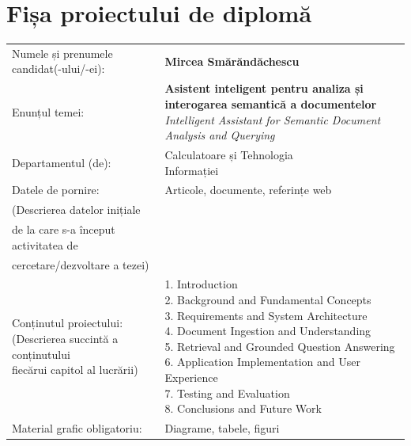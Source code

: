 \chapter*{Fișa proiectului de diplomă}
\begin{tabular}{@{}p{0.46\textwidth}p{0.48\textwidth}@{}}
	Numele și prenumele candidat(-ului/-ei):\vspace{10pt} & \textbf{Mircea Smărăndăchescu} \\

	Enunțul temei:\vspace{10pt} & \parbox[t]{\linewidth}{\textbf{Asistent inteligent pentru analiza și interogarea semantică a documentelor}\\\textit{Intelligent Assistant for Semantic Document Analysis and Querying}} \\
	
	Departamentul (de):\vspace{10pt} & \parbox[t]{\linewidth}{Calculatoare și Tehnologia\\Informației}\\
	
	Datele de pornire: & Articole, documente, referințe web \\
	(Descrierea datelor inițiale & \\
	de la care s-a început activitatea de & \\ cercetare/dezvoltare a tezei)\vspace{10pt} & \\
	
	\parbox[t]{\linewidth}{Conținutul proiectului:\\
	(Descrierea succintă a conținutului\\
	fiecărui capitol al lucrării)} &
	\parbox[t]{\linewidth}{\scriptsize\raggedright
	1. Introduction\\
	2. Background and Fundamental Concepts\\
	3. Requirements and System Architecture\\
	4. Document Ingestion and Understanding\\
	5. Retrieval and Grounded Question Answering\\
	6. Application Implementation and User Experience\\
	7. Testing and Evaluation\\
	8. Conclusions and Future Work} \\

	Material grafic obligatoriu:\vspace{10pt} & Diagrame, tabele, figuri \\


\end{tabular}
